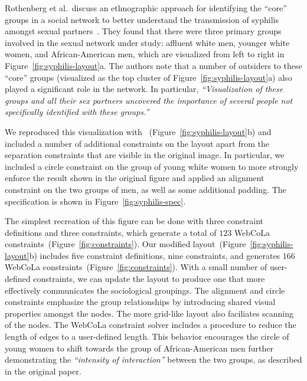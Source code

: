Rothenberg et al.\ discuss an ethnographic approach for identifying the
``core'' groups in a social network to better understand the transmission
of syphilis amongst sexual partners~\cite{rothenberg1998using}. They found
that there were three primary groups involved in the sexual network under study:
affluent white men, younger white women, and African-American men, 
which are visualized from left to right in Figure~\ref{fig:syphilis-layout}a. 
The authors note that a number of outsiders to these ``core'' groups
(visualized as the top cluster of Figure~\ref{fig:syphilis-layout}a) 
also played a significant role in the network. In
particular, \emph{``Visualization of these groups and all their sex
  partners uncovered the importance of several people not specifically
  identified with these groups.''}

We reproduced this visualization with \projectname~(Figure~\ref{fig:syphilis-layout}b) 
and included a number of additional constraints on the layout apart
from the separation constraints that are visible in the original image. In
particular, we included a circle constraint on the group of young white
women to more strongly enforce the result shown in the original figure and
applied an alignment constraint on the two groups of
men, as well as some additional padding. The \projectname specification
is shown in Figure~\ref{fig:syphilis-spec}.


The simplest recreation of this figure can be done with three constraint
definitions and three \projectname constraints, which generate a total of
$123$ WebCoLa constraints~(Figure~\ref{fig:constraints}).
Our modified layout~(Figure~\ref{fig:syphilis-layout}b) includes 
five constraint definitions, nine \projectname constraints, and generates 
$166$ WebCoLa constraints~(Figure~\ref{fig:constraints}). With a small 
number of user-defined constraints, we can update the layout to produce
one that more effectively communicates the sociological groupings. The
alignment and circle constraints emphasize the group relationships by
introducing shared visual properties amongst the nodes. The more grid-like
layout also faciliates scanning of the nodes. The
WebCoLa constraint solver includes a procedure to reduce the length of
edges to a user-defined length. This behavior encourages the circle of young women
to shift towards the group of African-American men further demonstrating
the \emph{``intensity of interaction''} between the two groups, as described in
the original paper.


